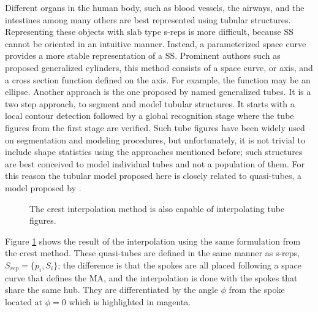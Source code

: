 Different organs in the human body, 
such as blood vessels, the airways, and the intestines 
among many others are best represented using tubular structures.
Representing these objects with slab type s-reps is more difficult, 
because SS cannot be oriented in an intuitive manner. 
Instead, a parameterized space curve provides a more stable representation of a SS. 
Prominent authors such as \cite{binford1971visual}
proposed generalized cylinders, 
this method consists of a space curve, 
or axis, and a cross section function defined on the axis. For example, the function may be an ellipse. 
Another approach is the one proposed by \cite{huang1993generalized} named generalized tubes.
It is a two step approach, to segment and model tubular structures.
It starts with a local contour detection followed by a global 
recognition stage where the tube figures from the first stage are verified.
Such tube figures have been widely used on segmentation and modeling procedures,
but unfortunately, it is not trivial to include shape statistics using the approaches mentioned before;
such structures are best conceived to model individual tubes and not a population of them.
For this reason the tubular model proposed here is closely related 
to quasi-tubes, a model proposed by \cite{saboomedial}.

\begin{figure} 
 \centering  
 \caption[Quasi-tube interpolation.]{The crest interpolation method is also capable of interpolating tube figures.}
 \label{fig:tubular}  
\end{figure} 

Figure  \ref{fig:tubular} shows the result of the interpolation using the same 
formulation from the crest method. 
These quasi-tubes are defined in the same manner as s-reps, $S_{rep} = \{p_i, S_i\}$; 
the difference is that the spokes are all placed following a space curve that 
defines the MA, and the interpolation is done with the spokes that share the same hub.
They are differentiated by the angle $\phi$ from 
the spoke located at $\phi = 0$ which is highlighted in magenta. 

